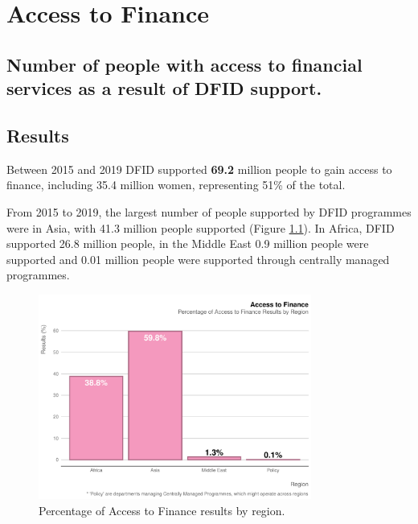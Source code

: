 \chapter{Access to Finance}

\section*{Number of people with access to financial services as a result of DFID support.}


\thispagestyle{empty}


\section{Results}



Between 2015 and 2019 DFID supported \textbf{69.2} million people to gain access to finance, including 35.4 million women, representing 51\% of the total. %

From 2015 to 2019, the largest number of people supported by DFID programmes were in Asia, with 41.3 million people supported (Figure \ref{fig:a2f_region_plot}). In Africa, DFID supported 26.8 million people, in the Middle East 0.9 million people were supported and 0.01 million people were supported through centrally managed programmes. %


\begin{figure}[htbp]
  \centering
\begin{knitrout}
\color{fgcolor}
\includegraphics[width=0.8\textwidth]{figs/a2f_region_plot-1} 

\end{knitrout}
	\caption{Percentage of Access to Finance results by region.}
	\label{fig:a2f_region_plot}
\end{figure}

